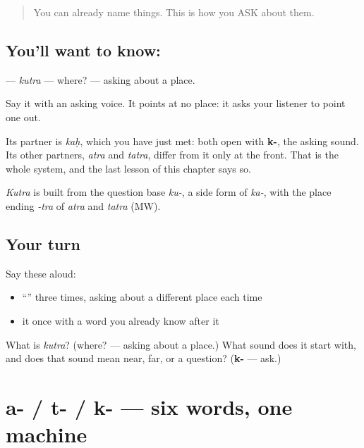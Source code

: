 \label{lesson:SA-C14-where}



\begin{quote}
You can already name things. This is how you ASK about them.
\end{quote}

\subsection*{You'll want to know: }
\textbf{} — \emph{kutra} — where? — asking about a place.

Say it with an asking voice. It points at no place: it asks your listener to point one out.

Its partner is \textbf{} \emph{kaḥ}, which you have just met: both open with \textbf{k-}, the asking sound. Its other partners, \textbf{} \emph{atra} and \textbf{} \emph{tatra}, differ from it only at the front. That is the whole system, and the last lesson of this chapter says so.

\begin{cousinweb}
\emph{Kutra} is built from the question base \emph{ku-}, a side form of \emph{ka-}, with the place ending \emph{-tra} of \emph{atra} and \emph{tatra} (MW).
\end{cousinweb}

\subsection*{Your turn}
Say these aloud:

\begin{itemize}
\raggedright
  \item \textquotedblleft{}\textquotedblright{} three times, asking about a different place each time
  \item it once with a word you already know after it
\end{itemize}

\begin{tcolorbox}[breakable,colback=teal!4,colframe=teal!35!black,title={Before you move on}]
What is \emph{kutra}? (where? — asking about a place.) What sound does it start with, and does that sound mean near, far, or a question? (\textbf{k-} — ask.)
\end{tcolorbox}
\section[a- / t- / k-]{a- / t- / k- — six words, one machine}

